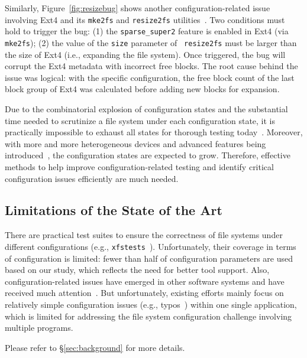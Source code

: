 Similarly, Figure~\ref{fig:resizebug} shows another configuration-related issue involving Ext4 and its \texttt{mke2fs} and \texttt{resize2fs} utilities~\cite{e2fsprogs}.
Two conditions must hold to trigger the bug: 
(1) the \texttt{sparse\_super2} feature is enabled in Ext4 (via \texttt{mke2fs});
(2) the value of the \texttt{size} parameter of ~\texttt{resize2fs} must be larger than the size of Ext4 (i.e., expanding the file system). Once triggered, the bug will corrupt the Ext4 metadata with incorrect free blocks. {The root cause behind the issue was logical: with the specific configuration, the free block count of the last block group of Ext4 was calculated before adding new blocks for expansion.}

Due to the combinatorial explosion of configuration states and the substantial time needed to scrutinize a file system under each 
configuration state,  
it is practically impossible to exhaust all
states 
for thorough testing  today~\cite{
EMClarke-ModelCheckingAndTheStateExplosionProblem}.
Moreover, with more and more heterogeneous devices and advanced features 
 being introduced~\cite{Ext4_DAX,samsungsmartssd,trimsupport}, the  configuration states 
 are expected to grow. 
 Therefore,  effective methods to help improve configuration-related testing and identify critical configuration issues efficiently are much needed. 



\subsection{Limitations of the State of the Art}
There are practical test suites  to ensure the correctness of file systems under different configurations (e.g., \texttt{xfstests}~\cite{xfstest}). 
Unfortunately, their coverage in terms of configuration is limited:
fewer than half of configuration parameters are used based on our study, which reflects the need for better tool support.
Also, configuration-related issues have   emerged in other software systems and have received much attention~\cite{cdep,ctest-OSDI20,Conferr-DSN08,spex,NavigatingMazeBioinfo-MikaelaCashman-ASE18}. But unfortunately, existing efforts mainly focus on relatively simple configuration issues  (e.g., typos~\cite{Conferr-DSN08}) within  one single application, which is  limited for addressing the file system configuration challenge involving multiple programs.

Please refer to \S\ref{sec:background} for more details.  


